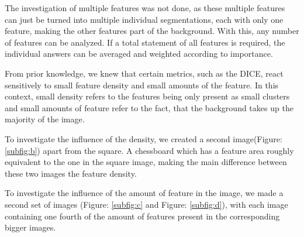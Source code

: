 \documentclass[journal]{IEEEtran}
\begin{document}
\hspace{2in}

The investigation of multiple features was not done, as these multiple features can just be turned into multiple individual segmentations, each with only one feature, making the other features part of the background. With this, any number of features can be analyzed. If a total statement of all features is required, the individual answers can be averaged and weighted according to importance.

\hspace{2in}

From prior knowledge, we knew that certain metrics, such as the DICE, react sensitively to small feature density and small amounts of the feature. In this context, small density refers to the features being only present as small clusters and small amounts of feature refer to the fact, that the background takes up the majority of the image.

\hspace{2in}

To investigate the influence of the density, we created a second image(Figure: \ref{subfig:b}) apart from the square. A chessboard which has a feature area roughly equivalent to the one in the square image, making the main difference between these two images the feature density. 

\hspace{2in}

To investigate the influence of the amount of feature in the image, we made a second set of images (Figure: \ref{subfig:c} and Figure: \ref{subfig:d}), with each image containing one fourth of the amount of features present in the corresponding bigger images.
\end{document}
